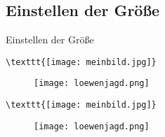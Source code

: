 \subsection{Einstellen der Größe}
\begin{frame}[c]
	\begin{center}
		\large Einstellen der Größe
	\end{center}
\end{frame}
\begin{frame}[fragile]
	\begin{lstlisting}
\texttt{[image: meinbild.jpg]}
	\end{lstlisting}
	\pause
	\begin{outputbox}
		\begin{figure}[H]
			\centering
			\texttt{[image: loewenjagd.png]}
		\end{figure}
	\end{outputbox}
	
	\pause
	\begin{lstlisting}
\texttt{[image: meinbild.jpg]}
	\end{lstlisting}
	\pause
	\begin{outputbox}
		\begin{figure}[H]
			\centering
			\texttt{[image: loewenjagd.png]}
		\end{figure}
	\end{outputbox}
\end{frame}
